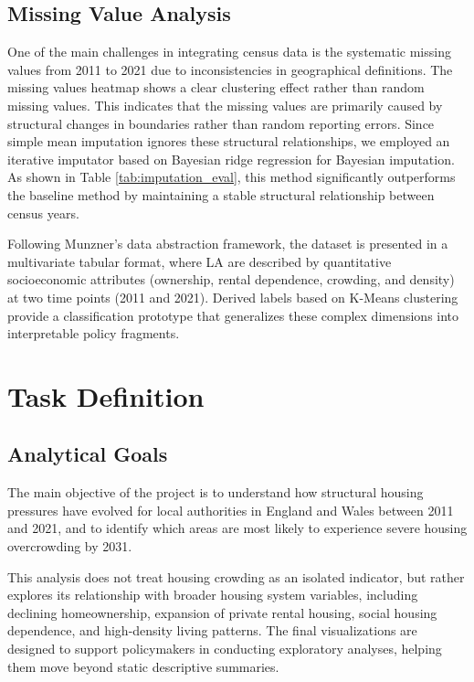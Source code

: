 \documentclass[conference]{IEEEtran}
\begin{document}
\subsection{Missing Value Analysis}
One of the main challenges in integrating census data is the systematic missing values from 2011 to 2021 due to inconsistencies in geographical definitions. The missing values heatmap shows a clear clustering effect rather than random missing values. This indicates that the missing values are primarily caused by structural changes in boundaries rather than random reporting errors. Since simple mean imputation ignores these structural relationships, we employed an iterative imputator based on Bayesian ridge regression for Bayesian imputation. As shown in Table \ref{tab:imputation_eval}, this method significantly outperforms the baseline method by maintaining a stable structural relationship between census years.

Following Munzner’s data abstraction framework\cite{noauthor_visualization_nodate}, the dataset is presented in a multivariate tabular format, where LA are described by quantitative socioeconomic attributes (ownership, rental dependence, crowding, and density) at two time points (2011 and 2021). Derived labels based on K-Means clustering provide a classification prototype that generalizes these complex dimensions into interpretable policy fragments.

\section{Task Definition}

\subsection{Analytical Goals}
The main objective of the project is to understand how structural housing pressures have evolved for local authorities in England and Wales between 2011 and 2021, and to identify which areas are most likely to experience severe housing overcrowding by 2031.

This analysis does not treat housing crowding as an isolated indicator, but rather explores its relationship with broader housing system variables, including declining homeownership, expansion of private rental housing, social housing dependence, and high-density living patterns. The final visualizations are designed to support policymakers in conducting exploratory analyses, helping them move beyond static descriptive summaries.
\end{document}
